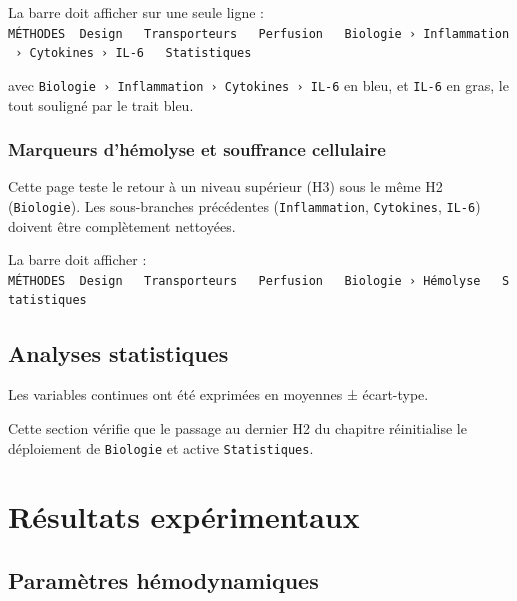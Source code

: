 \documentclass[
  french,
  10pt,
  a4paper,
]{scrartcl}
\begin{document}
La barre doit afficher sur une seule ligne :
\texttt{MÉTHODES\ \textbar{}\ Design\ \ \ Transporteurs\ \ \ Perfusion\ \ \ Biologie\ ›\ Inflammation\ ›\ Cytokines\ ›\ IL-6\ \ \ Statistiques}

avec \texttt{Biologie\ ›\ Inflammation\ ›\ Cytokines\ ›\ IL-6} en bleu,
et \texttt{IL-6} en gras, le tout souligné par le trait bleu.

\newpage



\subsubsection{Marqueurs d'hémolyse et souffrance
cellulaire}\label{marqueurs-dhuxe9molyse-et-souffrance-cellulaire}

Cette page teste le retour à un niveau supérieur (H3) sous le même H2
(\texttt{Biologie}). Les sous-branches précédentes
(\texttt{Inflammation}, \texttt{Cytokines}, \texttt{IL-6}) doivent être
complètement nettoyées.

La barre doit afficher :
\texttt{MÉTHODES\ \textbar{}\ Design\ \ \ Transporteurs\ \ \ Perfusion\ \ \ Biologie\ ›\ Hémolyse\ \ \ Statistiques}

\newpage



\subsection{Analyses statistiques}\label{analyses-statistiques}

Les variables continues ont été exprimées en moyennes ± écart-type.

Cette section vérifie que le passage au dernier H2 du chapitre
réinitialise le déploiement de \texttt{Biologie} et active
\texttt{Statistiques}.

\newpage

\clearpage

\section{Résultats expérimentaux}\label{ruxe9sultats-expuxe9rimentaux}



\subsection{Paramètres
hémodynamiques}\label{paramuxe8tres-huxe9modynamiques}
\end{document}
